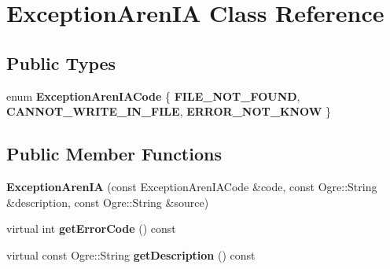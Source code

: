 \hypertarget{class_exception_aren_i_a}{}\section{Exception\+Aren\+IA Class Reference}
\label{class_exception_aren_i_a}
\subsection*{Public Types}
\begin{DoxyCompactItemize}
\item 
enum {\bfseries Exception\+Aren\+I\+A\+Code} \{ {\bfseries F\+I\+L\+E\+\_\+\+N\+O\+T\+\_\+\+F\+O\+U\+ND}, 
{\bfseries C\+A\+N\+N\+O\+T\+\_\+\+W\+R\+I\+T\+E\+\_\+\+I\+N\+\_\+\+F\+I\+LE}, 
{\bfseries E\+R\+R\+O\+R\+\_\+\+N\+O\+T\+\_\+\+K\+N\+OW}
 \}\hypertarget{class_exception_aren_i_a_a71245d2698226a5d28346e161df3ecb1}{}\label{class_exception_aren_i_a_a71245d2698226a5d28346e161df3ecb1}

\end{DoxyCompactItemize}
\subsection*{Public Member Functions}
\begin{DoxyCompactItemize}
\item 
{\bfseries Exception\+Aren\+IA} (const Exception\+Aren\+I\+A\+Code \&code, const Ogre\+::\+String \&description, const Ogre\+::\+String \&source)\hypertarget{class_exception_aren_i_a_aafb9b296676d3c0fc513df71befbb337}{}\label{class_exception_aren_i_a_aafb9b296676d3c0fc513df71befbb337}

\item 
virtual int {\bfseries get\+Error\+Code} () const \hypertarget{class_exception_aren_i_a_aa0121146b149c17b89603d6aea849ab4}{}\label{class_exception_aren_i_a_aa0121146b149c17b89603d6aea849ab4}

\item 
virtual const Ogre\+::\+String {\bfseries get\+Description} () const \hypertarget{class_exception_aren_i_a_a36a91b5ca5f01a491cb8b6dd0bd84717}{}\label{class_exception_aren_i_a_a36a91b5ca5f01a491cb8b6dd0bd84717}

\end{DoxyCompactItemize}
